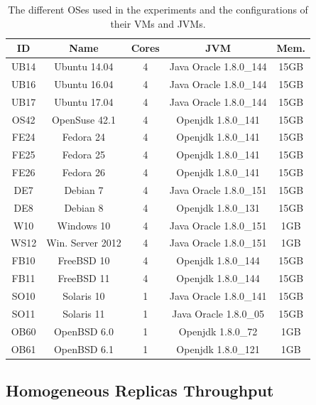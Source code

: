 \begin{table}[t]
\begin{center}
{\footnotesize
\begin{tabular}{| c | c | c | c | c |}\hline
\textbf{ID} & \textbf{Name}  & \textbf{Cores} & \textbf{JVM} & \textbf{Mem.} \\\hline\hline
UB14 & Ubuntu 14.04 & 4 & Java Oracle 1.8.0\_144 & 15GB \\ \hline
UB16 & Ubuntu 16.04 & 4 & Java Oracle 1.8.0\_144 & 15GB \\ \hline
UB17 & Ubuntu 17.04 & 4 & Java Oracle 1.8.0\_144 & 15GB \\ \hline
OS42 & OpenSuse 42.1 & 4 & Openjdk 1.8.0\_141 & 15GB \\ \hline
FE24 & Fedora 24 & 4 & Openjdk 1.8.0\_141 & 15GB \\ \hline
FE25 & Fedora 25 & 4 & Openjdk 1.8.0\_141 & 15GB \\ \hline
FE26 & Fedora 26 & 4 & Openjdk 1.8.0\_141 & 15GB \\ \hline
DE7 & Debian 7 & 4 & Java Oracle 1.8.0\_151 & 15GB \\ \hline
DE8 & Debian 8 & 4 & Openjdk 1.8.0\_131 & 15GB \\ \hline
W10 & Windows 10 & 4 & Java Oracle 1.8.0\_151 &1GB \\ \hline
WS12 & Win. Server 2012 & 4 & Java Oracle 1.8.0\_151 & 1GB \\ \hline
FB10 & FreeBSD 10 & 4 & Openjdk 1.8.0\_144 & 15GB \\ \hline
FB11 & FreeBSD 11 & 4 & Openjdk 1.8.0\_144 & 15GB \\ \hline
SO10 & Solaris 10 & 1 & Java Oracle 1.8.0\_141 & 15GB \\ \hline
SO11 & Solaris 11 & 1 & Java Oracle 1.8.0\_05 & 15GB \\ \hline
OB60 & OpenBSD 6.0 & 1 & Openjdk 1.8.0\_72 & 1GB \\ \hline
OB61 & OpenBSD 6.1 & 1 & Openjdk 1.8.0\_121 & 1GB \\ \hline
\end{tabular}
}
\caption{The different OSes used in the experiments and the configurations of their VMs and JVMs.}
\label{tab:oses}
\end{center}
\end{table}


\subsection{Homogeneous Replicas Throughput}


